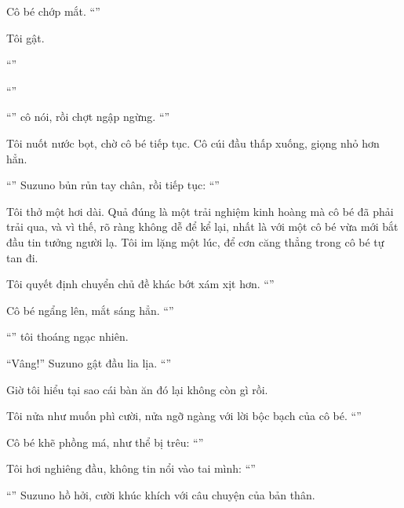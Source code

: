 \documentclass[../main.tex]{subfiles}
\begin{document}
Cô bé chớp mắt. ``''

Tôi gật.

``''

``''

``'' cô nói, rồi chợt ngập ngừng. ``''

Tôi nuốt nước bọt, chờ cô bé tiếp tục. Cô cúi đầu thấp xuống, giọng nhỏ hơn hẳn.

``'' Suzuno bủn rủn tay chân, rồi tiếp tục: ``''

Tôi thở một hơi dài. Quả đúng là một trải nghiệm kinh hoàng mà cô bé đã phải trải qua, và vì thế, rõ ràng không dễ để kể lại, nhất là với một cô bé vừa mới bắt đầu tin tưởng người lạ. Tôi im lặng một lúc, để cơn căng thẳng trong cô bé tự tan đi.

Tôi quyết định chuyển chủ đề khác bớt xám xịt hơn. ``''

Cô bé ngẩng lên, mắt sáng hẳn. ``''

``'' tôi thoáng ngạc nhiên.

``Vâng!'' Suzuno gật đầu lia lịa. ``''

Giờ tôi hiểu tại sao cái bàn ăn đó lại không còn gì rồi.

Tôi nửa như muốn phì cười, nửa ngỡ ngàng với lời bộc bạch của cô bé. ``''

Cô bé khẽ phồng má, như thể bị trêu: ``''

Tôi hơi nghiêng đầu, không tin nổi vào tai mình: ``''

``'' Suzuno hồ hởi, cười khúc khích với câu chuyện của bản thân.
\end{document}
